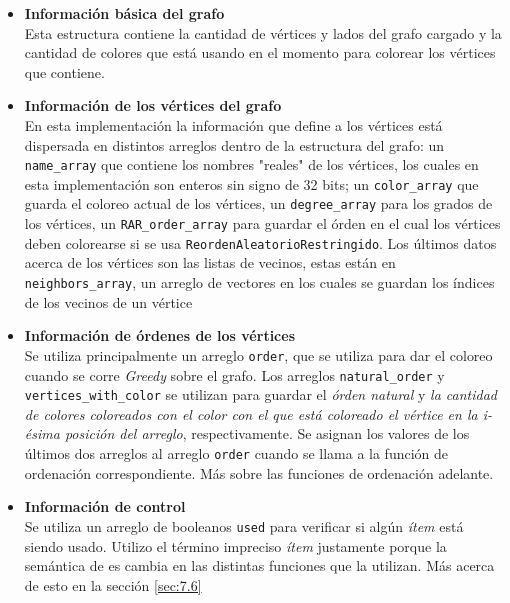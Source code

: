 \documentclass[11pt,a4paper]{article}
\theoremstyle{plain}
\begin{document}
\begin{itemize}
\item\textbf{{Información básica del grafo}}\\

 Esta estructura contiene la cantidad de vértices y lados del grafo cargado y la cantidad de colores que está usando en el momento para colorear los vértices que contiene.\\

\item\textbf{{Información de los vértices del grafo}}\\
 
 En esta implementación la información que define a los vértices está dispersada en distintos arreglos dentro de la estructura del grafo: un \texttt{name\_array} que contiene los nombres "reales" de los vértices, los cuales en esta implementación son enteros sin signo de 32 bits; un \texttt{color\_array} que guarda el coloreo actual de los vértices, un \texttt{degree\_array} para los grados de los vértices, un \texttt{RAR\_order\_array} para guardar el órden en el cual los vértices deben colorearse si se usa \texttt{ReordenAleatorioRestringido}. Los últimos datos acerca de los vértices son las listas de vecinos, estas están en \texttt{neighbors\_array}, un arreglo de vectores en los cuales se guardan los índices de los vecinos de un vértice\\

\item\textbf{{Información de órdenes de los vértices}}\\

Se utiliza principalmente un arreglo \texttt{order}, que se utiliza para dar el coloreo cuando se corre \emph{Greedy} sobre el grafo. Los arreglos \texttt{natural\_order} y \texttt{vertices\_with\_color} se utilizan para guardar el \emph{órden natural} y \emph{la cantidad de colores coloreados con el color con el que está coloreado el vértice en la i-ésima posición del arreglo}, respectivamente. Se asignan los valores de los últimos dos arreglos al arreglo \texttt{order} cuando se llama a la función de ordenación correspondiente. Más sobre las funciones de ordenación adelante.

\item\textbf{{Información de control}}\\

Se utiliza un arreglo de booleanos \texttt{used} para verificar si algún \emph{ítem} está siendo usado. Utilizo el término impreciso \emph{ítem} justamente porque la semántica de es cambia en las distintas funciones que la utilizan. Más acerca de esto en la sección \ref{sec:7.6}


\end{itemize}
\end{document}
